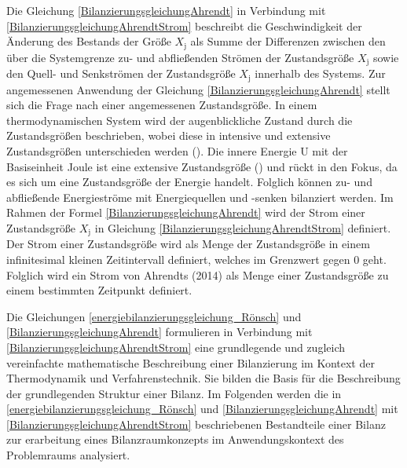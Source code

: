 Die Gleichung \eqref{BilanzierungsgleichungAhrendt} in Verbindung mit \eqref{BilanzierungsgleichungAhrendtStrom} beschreibt die Geschwindigkeit der Änderung des Bestands der Größe
\(X_{\text{j}}\) als Summe der Differenzen zwischen den über die Systemgrenze zu- und abfließenden Strömen der Zustandsgröße
\(X_{\text{j}}\) sowie den Quell- und Senkströmen der Zustandsgröße \(X_{\text{j}}\) innerhalb des Systems.  
Zur angemessenen Anwendung der Gleichung \eqref{BilanzierungsgleichungAhrendt} stellt sich die Frage nach einer angemessenen Zustandsgröße.
In einem thermodynamischen System wird der augenblickliche Zustand durch die Zustandsgrößen beschrieben, wobei diese in intensive und extensive Zustandsgrößen 
unterschieden werden (\cite[S. 66]{Konstantin.2023}). Die innere Energie U mit der Basiseinheit Joule ist eine extensive Zustandsgröße 
(\cite[S. 65]{Konstantin.2023}) und rückt in den Fokus, da es sich um eine Zustandsgröße der Energie handelt.
Folglich können zu- und abfließende Energieströme mit Energiequellen und -senken bilanziert werden.
Im Rahmen der Formel \eqref{BilanzierungsgleichungAhrendt} wird der Strom einer Zustandsgröße \(X_{\text{j}}\) in Gleichung \eqref{BilanzierungsgleichungAhrendtStrom} definiert.
Der Strom einer Zustandsgröße wird als Menge der Zustandsgröße in einem infinitesimal kleinen Zeitintervall definiert, welches im Grenzwert gegen 0 geht.
Folglich wird ein Strom von Ahrendts (2014) als Menge einer Zustandsgröße zu einem bestimmten Zeitpunkt definiert.

Die Gleichungen \eqref{energiebilanzierungsgleichung_Rönsch} und \eqref{BilanzierungsgleichungAhrendt} formulieren in Verbindung mit 
\eqref{BilanzierungsgleichungAhrendtStrom} eine grundlegende und zugleich vereinfachte mathematische Beschreibung einer Bilanzierung im Kontext der Thermodynamik und 
Verfahrenstechnik. Sie bilden die Basis für die Beschreibung der grundlegenden Struktur einer Bilanz.
Im Folgenden werden die in \eqref{energiebilanzierungsgleichung_Rönsch} und \eqref{BilanzierungsgleichungAhrendt} mit \eqref{BilanzierungsgleichungAhrendtStrom} 
beschriebenen Bestandteile einer Bilanz zur erarbeitung eines Bilanzraumkonzepts im Anwendungskontext des Problemraums analysiert.